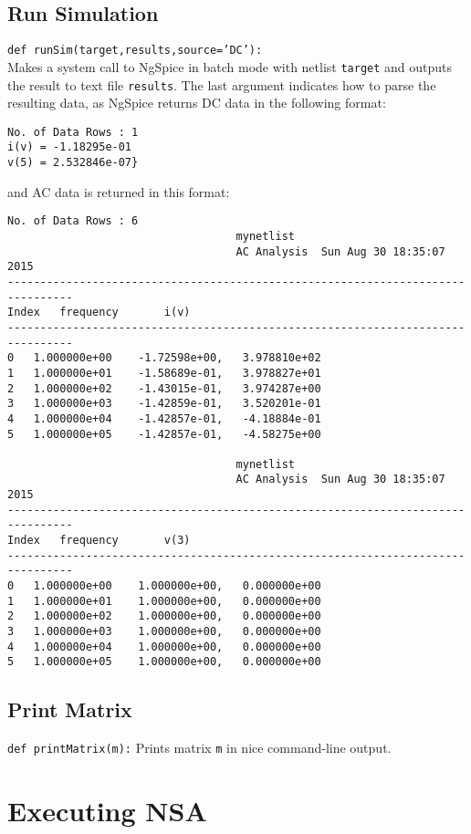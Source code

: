 \subsection{Run Simulation}
\texttt{def runSim(target,results,source='DC'):}\\
Makes a system call to NgSpice in batch mode with netlist \texttt{target} and outputs the result to text file \texttt{results}.
The last argument indicates how to parse the resulting data, as NgSpice returns DC data in the following format:
\begin{Verbatim}[fontsize=\footnotesize]
No. of Data Rows : 1
i(v) = -1.18295e-01
v(5) = 2.532846e-07}
\end{Verbatim}
and AC data is returned in this format:
\begin{Verbatim}[fontsize=\footnotesize]
No. of Data Rows : 6
                                   mynetlist
                                   AC Analysis  Sun Aug 30 18:35:07  2015
--------------------------------------------------------------------------------
Index   frequency       i(v)                            
--------------------------------------------------------------------------------
0	1.000000e+00	-1.72598e+00,	3.978810e+02	
1	1.000000e+01	-1.58689e-01,	3.978827e+01	
2	1.000000e+02	-1.43015e-01,	3.974287e+00	
3	1.000000e+03	-1.42859e-01,	3.520201e-01	
4	1.000000e+04	-1.42857e-01,	-4.18884e-01	
5	1.000000e+05	-1.42857e-01,	-4.58275e+00	

                                   mynetlist
                                   AC Analysis  Sun Aug 30 18:35:07  2015
--------------------------------------------------------------------------------
Index   frequency       v(3)                            
--------------------------------------------------------------------------------
0	1.000000e+00	1.000000e+00,	0.000000e+00	
1	1.000000e+01	1.000000e+00,	0.000000e+00	
2	1.000000e+02	1.000000e+00,	0.000000e+00	
3	1.000000e+03	1.000000e+00,	0.000000e+00	
4	1.000000e+04	1.000000e+00,	0.000000e+00	
5	1.000000e+05	1.000000e+00,	0.000000e+00
\end{Verbatim}
\subsection{Print Matrix}
\texttt{def printMatrix(m):}
Prints matrix \texttt{m} in nice command-line output.
\section{Executing NSA}
